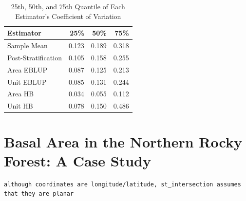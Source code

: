 \documentclass[12pt,twoside]{reedthesis}
\newenvironment{Shaded}{\begin{snugshade}}{\end{snugshade}}
\newcommand{\DataTypeTok}[1]{\textcolor[rgb]{0.13,0.29,0.53}{#1}}
\newcommand{\KeywordTok}[1]{\textcolor[rgb]{0.13,0.29,0.53}{\textbf{#1}}}
\newcommand{\NormalTok}[1]{#1}
\newcommand{\OperatorTok}[1]{\textcolor[rgb]{0.81,0.36,0.00}{\textbf{#1}}}
\newcommand{\OtherTok}[1]{\textcolor[rgb]{0.56,0.35,0.01}{#1}}
\newcommand{\StringTok}[1]{\textcolor[rgb]{0.31,0.60,0.02}{#1}}
\begin{document}
\begin{longtable}[t]{lrrr}
\caption[Coefficient of Variation Quantiles]{\label{tab:quantile-table}25th, 50th, and 75th Quantile of Each Estimator's Coefficient of Variation}\\
\toprule
Estimator & 25\% & 50\% & 75\%\\
\midrule
Sample Mean & 0.123 & 0.189 & 0.318\\
Post-Stratification & 0.105 & 0.158 & 0.255\\
Area EBLUP & 0.087 & 0.125 & 0.213\\
Unit EBLUP & 0.085 & 0.131 & 0.244\\
Area HB & 0.034 & 0.055 & 0.112\\
\addlinespace
Unit HB & 0.078 & 0.150 & 0.486\\
\bottomrule
\end{longtable}
\hypertarget{basal-area-in-the-northern-rocky-forest-a-case-study}{%
\section{Basal Area in the Northern Rocky Forest: A Case Study}\label{basal-area-in-the-northern-rocky-forest-a-case-study}}
\begin{Shaded}
\end{Shaded}
\begin{verbatim}
although coordinates are longitude/latitude, st_intersection assumes that they are planar
\end{verbatim}
\end{document}
